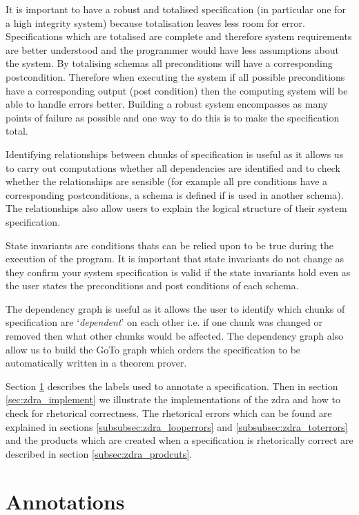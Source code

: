 It is important to have a robust and totalised specification (in particular one
for a high integrity system) because totalisation leaves less room for error.
Specifications which are totalised are complete and therefore system
requirements are better understood and the programmer would have
less assumptions about the system.
By totalising schemas all preconditions will have a corresponding postcondition.
Therefore when executing the system if all possible preconditions have a
corresponding output (post condition) then the computing system will be able to
handle errors better. Building a robust system encompasses as many points of
failure  as possible and one way to do this is to make the specification total.

Identifying relationships between chunks of specification is useful as it allows
us to carry out computations whether all dependencies are identified and to
check whether the relationships are sensible (for example all pre conditions
have a corresponding postconditions, a schema is defined if is used in another
schema). The relationships also allow users to explain the logical structure of
their system specification.

State invariants are conditions thats can be relied upon to be true during the
execution of the program. It is important that state invariants do not change as
they confirm your system specification is valid if the state invariants hold
even as the user states the preconditions and post conditions of each schema. 

The dependency graph is useful as it allows the user to identify which chunks of
specification are `\textit{dependent}' on each other i.e. if one chunk was
changed or removed then what other chunks would be affected. The dependency
graph also allow us to build the GoTo graph which orders the
specification to be automatically written in a theorem prover.

Section \ref{sec:zdra_annotate} describes the labels used to annotate a
specification. Then in section \ref{sec:zdra_implement} we illustrate the
implementations of the \gls{zdra} and how to check for rhetorical correctness.
The rhetorical errors which can be found are explained in sections
\ref{subsubsec:zdra_looperrors} and \ref{subsubsec:zdra_toterrors} and the
products which are created when a specification is rhetorically correct are
described in section \ref{subsec:zdra_prodcuts}.

\section{Annotations}
\label{sec:zdra_annotate}


